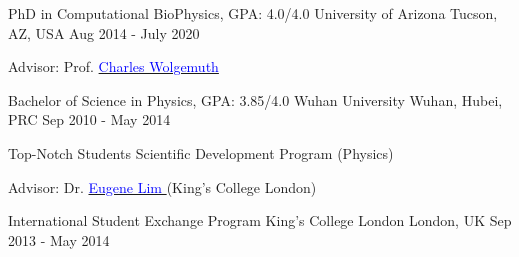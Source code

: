 
\begin{cventries}
  \cventry
    {PhD in Computational BioPhysics, GPA: 4.0/4.0} %
    {University of Arizona} %
    {Tucson, AZ, USA} %
    {Aug 2014 - July 2020} %
    {  \begin{cvitems} %
         \item {Advisor: Prof. \href{https://w3.physics.arizona.edu/people/charles-wolgemuth}{\textcolor{blue}{Charles Wolgemuth} } }
      \end{cvitems}
    }

  \cventry
    {Bachelor of Science in Physics, GPA: 3.85/4.0} %
    {Wuhan University} %
    {Wuhan, Hubei, PRC} %
    {Sep 2010 - May 2014} %
    {  \begin{cvitems} %
         \item {Top-Notch Students Scientific Development Program (Physics)}
         \item {Advisor: Dr. \href{https://www.kcl.ac.uk/people/eugene-lim}{\textcolor{blue}{Eugene Lim} }(King's College London) }
      \end{cvitems}
    }
   
  \cventry
    {International Student Exchange Program} %
    {King's College London} %
    {London, UK} %
    {Sep 2013 - May 2014} %
    {}    
\end{cventries}
